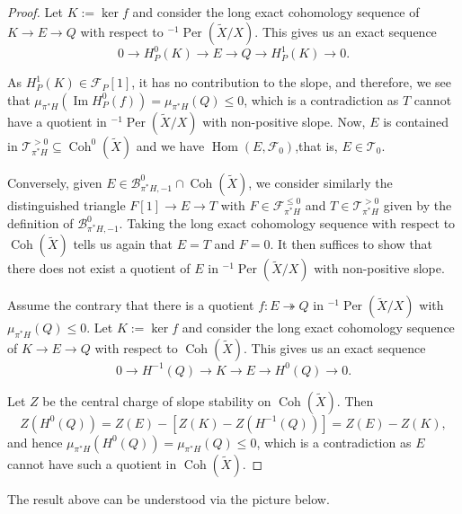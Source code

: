 \documentclass[12pt]{amsart}
\theoremstyle{definition}
\DeclareMathOperator{\Img}{Im}
\DeclareMathOperator{\Hom}{Hom}
\DeclareMathOperator{\Coh}{Coh}
\DeclareMathOperator{\Per}{Per}
\begin{document}
\begin{proof}
Let $K:= \ker f$ and consider the long exact cohomology sequence of $K \longrightarrow E \longrightarrow Q$ with respect to $^{-1}\Per(\widetilde{X}/X)$.
This gives us an exact sequence
$$ 0 \longrightarrow H^0_P(K) \longrightarrow E \longrightarrow Q
\longrightarrow H^1_P(K)
\longrightarrow 0. $$

As $H^1_P(K) \in \mathcal{F}_P[1]$, it has no contribution to the slope, and therefore, we see that $\mu_{\pi^\ast H}(\Img H^0_P(f))=\mu_{\pi^\ast H}(Q) \leq 0$,
which is a contradiction as $T$ cannot have a quotient in $^{-1}\Per(\widetilde{X}/X)$ with non-positive slope.
Now, $E$ is contained in $\mathcal{T}^{>0}_{\pi^\ast H}\subseteq \Coh^0(\widetilde{X})$ and we have $\Hom(E,\mathcal{F}_0)$,that is, $E \in \mathcal{T}_0$.

Conversely, given $E \in \mathcal{B}^0_{\pi^\ast H,-1} \cap \Coh(\widetilde{X})$,
we consider similarly the distinguished triangle $F[1] \longrightarrow E \longrightarrow T$ with $F \in \mathcal{F}^{\leq 0}_{\pi^\ast H}$ and $T \in \mathcal{T}^{> 0}_{\pi^\ast H}$ given by the definition of $\mathcal{B}^0_{\pi^\ast H,-1}$. 
Taking the long exact cohomology sequence with respect to $\Coh(\widetilde{X
})$ tells us again that $E=T$ and $F=0$.
It then suffices to show that there does not exist a quotient of $E$ in $^{-1}\Per(\widetilde{X}/X)$ with non-positive slope.

Assume the contrary that there is a quotient $f \colon E \twoheadrightarrow Q$ in $^{-1}\Per(\widetilde{X}/X)$ with $\mu_{\pi^\ast H}(Q) \leq 0$.
Let $K:= \ker f$ and consider the long exact cohomology sequence of $K \longrightarrow E \longrightarrow Q$ with respect to $\Coh(\widetilde{X})$.
This gives us an exact sequence
$$ 0 \longrightarrow H^{-1}(Q) \longrightarrow K \longrightarrow E
\longrightarrow H^0(Q)
\longrightarrow 0. $$
 
Let $Z$ be the central charge of slope stability on $\Coh(\widetilde{X})$.
Then $$Z(H^0(Q))=Z(E)-[Z(K)-Z(H^{-1}(Q))]=Z(E)-Z(K),$$
and hence $\mu_{\pi^\ast H}(H^0(Q))=\mu_{\pi^\ast H}(Q)\leq0$, which is a contradiction as $E$ cannot have such a quotient in $\Coh(\widetilde{X})$.
\end{proof}
 
The result above can be understood via the picture below.
\end{document}
